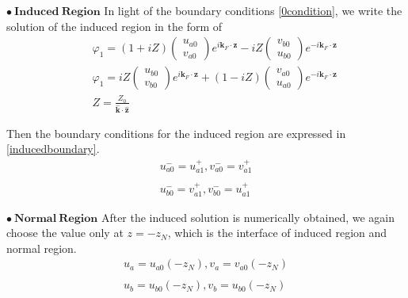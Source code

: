 $\mathbf{\bullet \ Induced \ Region}$
In light of the boundary conditions \eqref{0condition}, we write the solution of the induced region in the form of
\begin{eqnarray}\label{induced form}
&&\varphi_1=
(1+iZ)\left(
\begin{array}{c}
 u_{a0}\\
 v_{a0}
 \end{array}\right)e^{i\mathbf{k}_F\cdot\mathbf{z}}-iZ\left(
\begin{array}{c}
 v_{b0}\\
 u_{b0}
 \end{array}\right)e^{-i\mathbf{k}_F\cdot\mathbf{z}}\nonumber\\
&&\varphi_1=
iZ\left(
\begin{array}{c}
 u_{b0}\\
 v_{b0}
 \end{array}\right)e^{i\mathbf{k}_F\cdot\mathbf{z}}+(1-iZ)\left(
\begin{array}{c}
 v_{a0}\\
 u_{a0}
 \end{array}\right)e^{-i\mathbf{k}_F\cdot\mathbf{z}}\nonumber\\
 &&Z=\frac{Z_0}{\widehat{\mathbf{k}}\cdot\widehat{\mathbf{z}}}
\end{eqnarray}

Then the boundary conditions for the induced region are expressed in \eqref{inducedboundary}.
\begin{eqnarray}\label{inducedboundary}
u_{a0}^-=u_{a1}^+,v_{a0}^-=v_{a1}^+\nonumber\\
\\
u_{b0}^-=v_{a1}^+,v_{b0}^-=u_{a1}^+\nonumber
\end{eqnarray}

$\mathbf{\bullet \ Normal \ Region}$
After the induced solution is numerically obtained, we again choose the value only at $z=-z_N$, which is the interface of induced region and normal region.
\begin{eqnarray}\label{normal condition}
u_a=u_{a0}(-z_N),v_a=v_{a0}(-z_N)\nonumber\\
\\
u_b=u_{b0}(-z_N),v_b=u_{b0}(-z_N)\nonumber
\end{eqnarray}

